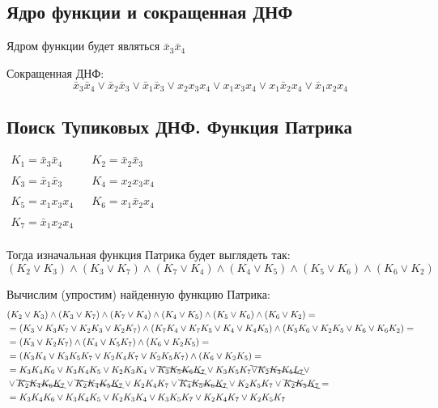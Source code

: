 \subsection{Ядро функции и сокращенная ДНФ}

Ядром функции будет являться $\bar{x}_3 \bar{x}_4$ 

\medskip

Сокращенная ДНФ:
\[
    \boxed{
\bar{x}_3\bar{x}_4 \lor \bar{x}_2 \bar{x}_3 \lor \bar{x}_1 \bar{x}_3 \lor x_2x_3x_4 \lor x_1x_3x_4 \lor
x_1 \bar{x}_2 x_4 \lor \bar{x}_1 x_2x_4
}
\] 

\subsection{Поиск Тупиковых ДНФ. Функция Патрика}

$
\begin{matrix}
    K_1 = \bar{x}_3 \bar{x}_4 && K_2 = \bar{x}_2 \bar{x}_3\\ \\
    K_3 = \bar{x}_1 \bar{x}_3 && K_4 = x_2x_3x_4\\ \\
    K_5 = x_1x_3x_4 && K_6 = x_1 \bar{x}_2 x_4\\ \\
    K_7 = \bar{x}_1x_2x_4\\
\end{matrix}
$

\medskip

Тогда изначальная функция Патрика будет выглядеть так:
\[
    (K_2 \lor K_3) \land (K_3 \lor K_7) \land (K_7 \lor K_4) \land (K_4 \lor K_5) \land (K_5 \lor K_6) \land (K_6 \lor K_2)
\] 


Вычислим (упростим) найденную функцию Патрика:
\begin{align*}
    &(K_2 \lor K_3) \land (K_3 \lor K_7) \land (K_7 \lor K_4) \land (K_4 \lor K_5) \land (K_5 \lor K_6) \land (K_6 \lor K_2) =\\
    &= (K_3 \lor K_3K_7 \lor K_2K_3 \lor K_2K_7) \land (K_7K_4 \lor K_7K_5 \lor K_4 \lor K_4K_5) 
    \land (K_5K_6 \lor K_2K_5 \lor K_6 \lor K_6K_2) = \\
    &= (K_3 \lor K_2K_7) \land (K_4 \lor K_5K_7) \land (K_6 \lor K_2K_5) = \\
    &= (K_3K_4 \lor K_3K_5K_7 \lor K_2K_4K_7 \lor K_2K_5K_7) \land (K_6 \lor K_2K_5) =\\
    &= K_3K_4K_6 \lor K_3K_4K_5 \lor K_2K_3K_4 \lor \bcancel{K_3K_5K_6K_7} \lor K_3K_5K_7 \bcancel{\lor K_2K_3K_5L_7} \lor\\
    &\lor \bcancel{K_2K_4K_6K_7} \lor \bcancel{K_2K_4K_5K_7} \lor K_2K_4K_7 \lor \bcancel{K_4K_5K_6K_7} \lor
    K_2K_5K_7 \lor \bcancel{K_2K_5K_7} = \\
    & = K_3K_4K_6 \lor K_3K_4K_5 \lor K_2K_3K_4 \lor K_3K_5K_7 \lor K_2K_4K_7 \lor K_2K_5K_7
\end{align*}


